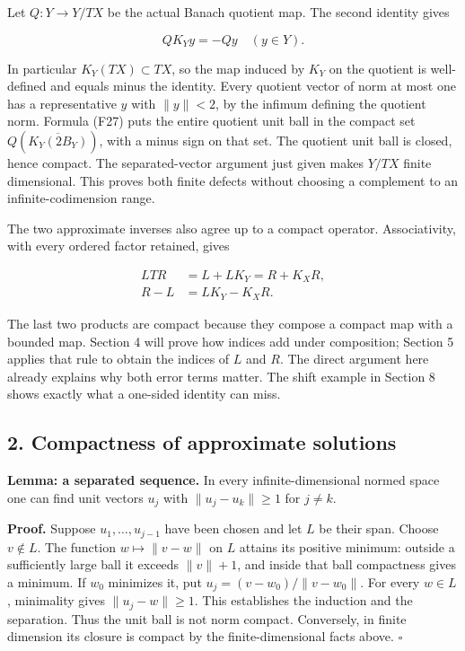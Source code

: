 \documentclass[
  11pt,
]{article}
\begin{document}
Let \(Q:Y\to Y/TX\) be the actual Banach quotient map. The second
identity gives

\[
                QK_Yy=-Qy\quad(y\in Y).                         \tag{F27}
\]

In particular \(K_Y(TX)\subset TX\), so the map induced by \(K_Y\) on
the quotient is well-defined and equals minus the identity. Every
quotient vector of norm at most one has a representative \(y\) with
\(\|y\|<2\), by the infimum defining the quotient norm. Formula (F27)
puts the entire quotient unit ball in the compact set
\(Q(\overline{K_Y(2B_Y)})\), with a minus sign on that set. The quotient
unit ball is closed, hence compact. The separated-vector argument just
given makes \(Y/TX\) finite dimensional. This proves both finite defects
without choosing a complement to an infinite-codimension range.

The two approximate inverses also agree up to a compact operator.
Associativity, with every ordered factor retained, gives

\[
 \begin{split}
 LTR&=L+LK_Y=R+K_XR,\\
 R-L&=LK_Y-K_XR .
 \end{split}                                                     \tag{F28}
\]

The last two products are compact because they compose a compact map
with a bounded map. Section 4 will prove how indices add under
composition; Section 5 applies that rule to obtain the indices of \(L\)
and \(R\). The direct argument here already explains why both error
terms matter. The shift example in Section 8 shows exactly what a
one-sided identity can miss.

\subsection{2. Compactness of approximate
solutions}\label{compactness-of-approximate-solutions}

\textbf{Lemma: a separated sequence.} In every infinite-dimensional
normed space one can find unit vectors \(u_j\) with \(\|u_j-u_k\|\geq1\)
for \(j\ne k\).

\textbf{Proof.} Suppose \(u_1,\ldots,u_{j-1}\) have been chosen and let
\(L\) be their span. Choose \(v\notin L\). The function
\(w\mapsto\|v-w\|\) on \(L\) attains its positive minimum: outside a
sufficiently large ball it exceeds \(\|v\|+1\), and inside that ball
compactness gives a minimum. If \(w_0\) minimizes it, put
\(u_j=(v-w_0)/\|v-w_0\|\). For every \(w\in L\), minimality gives
\(\|u_j-w\|\geq1\). This establishes the induction and the separation.
Thus the unit ball is not norm compact. Conversely, in finite dimension
its closure is compact by the finite-dimensional facts above.
\(\square\)
\end{document}
